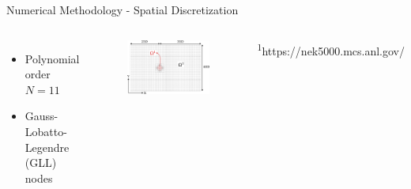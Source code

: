 \documentclass[aspectratio=169,xcolor=dvipsnames]{beamer}
\begin{document}
\begin{frame}{Numerical Methodology - Spatial Discretization}
\begin{columns}[c]
        \begin{itemize}
            \item Polynomial order $N = 11$
            \item Gauss-Lobatto-Legendre (GLL) nodes
        \end{itemize}
        \begin{figure}
            \includegraphics[width=\textwidth]{figures/mesh.pdf}
        \end{figure}
            \footnotesize
            \textsuperscript{1}https://nek5000.mcs.anl.gov/
            \normalsize 
    \end{columns}
\end{frame}

\end{document}
